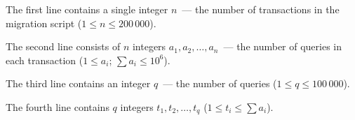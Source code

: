 The first line contains a single integer $n$~--- the number of transactions in the migration script ($1 \le n \le 200\,000$).

The second line consists of $n$ integers $a_1, a_2, \ldots, a_n$~--- the number of queries in each transaction ($1 \le a_i$; $\sum{a_i} \le 10^6$).

The third line contains an integer $q$~--- the number of queries ($1 \le q \le 100\,000$).

The fourth line contains $q$ integers $t_1, t_2, \ldots, t_q$ ($1 \le t_i \le \sum{a_i}$).